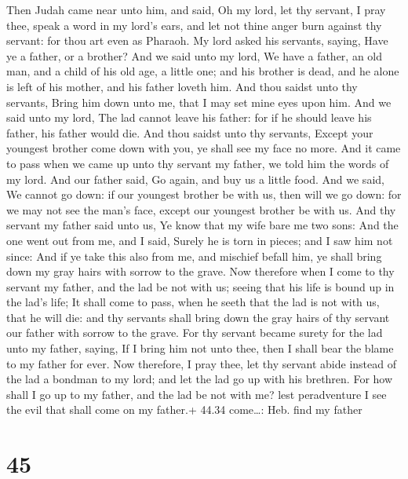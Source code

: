  Then Judah came near unto him, and said, Oh my lord, let
thy servant, I pray thee, speak a word in my lord's ears, and let not
thine anger burn against thy servant: for thou art even as Pharaoh.
 My lord asked his servants, saying, Have ye a father, or a
brother?  And we said unto my lord, We have a father, an
old man, and a child of his old age, a little one; and his brother is
dead, and he alone is left of his mother, and his father loveth him.
 And thou saidst unto thy servants, Bring him down unto me,
that I may set mine eyes upon him.  And we said unto my
lord, The lad cannot leave his father: for if he should leave his
father, his father would die.  And thou saidst unto thy
servants, Except your youngest brother come down with you, ye shall see
my face no more.  And it came to pass when we came up unto
thy servant my father, we told him the words of my lord. 
And our father said, Go again, and buy us a little food. 
And we said, We cannot go down: if our youngest brother be with us, then
will we go down: for we may not see the man's face, except our youngest
brother be with us.  And thy servant my father said unto
us, Ye know that my wife bare me two sons:  And the one
went out from me, and I said, Surely he is torn in pieces; and I saw him
not since:  And if ye take this also from me, and mischief
befall him, ye shall bring down my gray hairs with sorrow to the grave.
 Now therefore when I come to thy servant my father, and
the lad be not with us; seeing that his life is bound up in the lad's
life;  It shall come to pass, when he seeth that the lad is
not with us, that he will die: and thy servants shall bring down the
gray hairs of thy servant our father with sorrow to the grave.
 For thy servant became surety for the lad unto my father,
saying, If I bring him not unto thee, then I shall bear the blame to my
father for ever.  Now therefore, I pray thee, let thy
servant abide instead of the lad a bondman to my lord; and let the lad
go up with his brethren.  For how shall I go up to my
father, and the lad be not with me? lest peradventure I see the evil
that shall come on my father.+ 44.34 come\ldots: Heb. find my father

\hypertarget{section-44}{%
\section{45}\label{section-44}}


